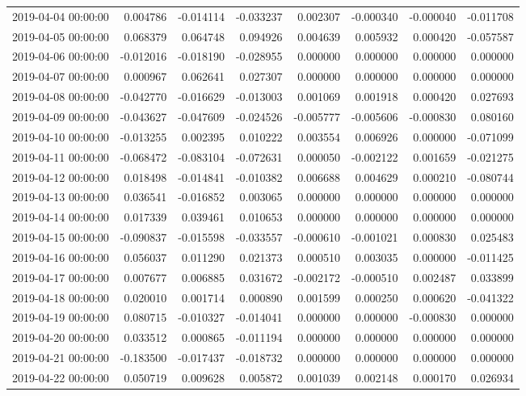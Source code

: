\begin{tabular}{lrrrrrrr}
2019-04-04 00:00:00 & 0.004786 & -0.014114 & -0.033237 & 0.002307 & -0.000340 & -0.000040 & -0.011708 \\
2019-04-05 00:00:00 & 0.068379 & 0.064748 & 0.094926 & 0.004639 & 0.005932 & 0.000420 & -0.057587 \\
2019-04-06 00:00:00 & -0.012016 & -0.018190 & -0.028955 & 0.000000 & 0.000000 & 0.000000 & 0.000000 \\
2019-04-07 00:00:00 & 0.000967 & 0.062641 & 0.027307 & 0.000000 & 0.000000 & 0.000000 & 0.000000 \\
2019-04-08 00:00:00 & -0.042770 & -0.016629 & -0.013003 & 0.001069 & 0.001918 & 0.000420 & 0.027693 \\
2019-04-09 00:00:00 & -0.043627 & -0.047609 & -0.024526 & -0.005777 & -0.005606 & -0.000830 & 0.080160 \\
2019-04-10 00:00:00 & -0.013255 & 0.002395 & 0.010222 & 0.003554 & 0.006926 & 0.000000 & -0.071099 \\
2019-04-11 00:00:00 & -0.068472 & -0.083104 & -0.072631 & 0.000050 & -0.002122 & 0.001659 & -0.021275 \\
2019-04-12 00:00:00 & 0.018498 & -0.014841 & -0.010382 & 0.006688 & 0.004629 & 0.000210 & -0.080744 \\
2019-04-13 00:00:00 & 0.036541 & -0.016852 & 0.003065 & 0.000000 & 0.000000 & 0.000000 & 0.000000 \\
2019-04-14 00:00:00 & 0.017339 & 0.039461 & 0.010653 & 0.000000 & 0.000000 & 0.000000 & 0.000000 \\
2019-04-15 00:00:00 & -0.090837 & -0.015598 & -0.033557 & -0.000610 & -0.001021 & 0.000830 & 0.025483 \\
2019-04-16 00:00:00 & 0.056037 & 0.011290 & 0.021373 & 0.000510 & 0.003035 & 0.000000 & -0.011425 \\
2019-04-17 00:00:00 & 0.007677 & 0.006885 & 0.031672 & -0.002172 & -0.000510 & 0.002487 & 0.033899 \\
2019-04-18 00:00:00 & 0.020010 & 0.001714 & 0.000890 & 0.001599 & 0.000250 & 0.000620 & -0.041322 \\
2019-04-19 00:00:00 & 0.080715 & -0.010327 & -0.014041 & 0.000000 & 0.000000 & -0.000830 & 0.000000 \\
2019-04-20 00:00:00 & 0.033512 & 0.000865 & -0.011194 & 0.000000 & 0.000000 & 0.000000 & 0.000000 \\
2019-04-21 00:00:00 & -0.183500 & -0.017437 & -0.018732 & 0.000000 & 0.000000 & 0.000000 & 0.000000 \\
2019-04-22 00:00:00 & 0.050719 & 0.009628 & 0.005872 & 0.001039 & 0.002148 & 0.000170 & 0.026934 \\

\end{tabular}
